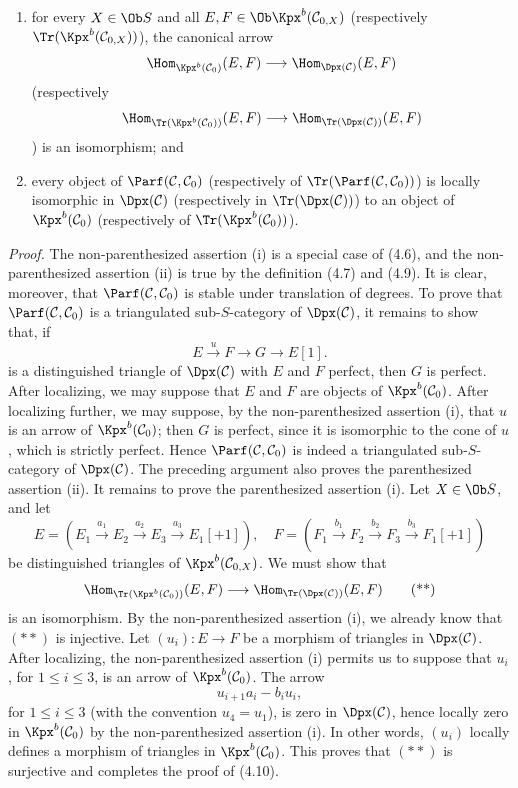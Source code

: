 \begin{enumerate}[label=(\roman*)]
\item for every \(X\in\Ob S\) and all \(E,F\in\Ob\Kpx^b(\mathcal C_{0,X})\) (respectively \(\Tr(\Kpx^b(\mathcal C_{0,X}))\)), the canonical arrow
\[
  \Hom_{\Kpx^b(\mathcal C_0)}(E,F)
  \longrightarrow
  \Hom_{\Dpx(\mathcal C)}(E,F)
\]
(respectively
\[
  \Hom_{\Tr(\Kpx^b(\mathcal C_0))}(E,F)
  \longrightarrow
  \Hom_{\Tr(\Dpx(\mathcal C))}(E,F)
\]) is an isomorphism; and
\item every object of \(\Parf(\mathcal C,\mathcal C_0)\) (respectively of \(\Tr(\Parf(\mathcal C,\mathcal C_0))\)) is locally isomorphic in \(\Dpx(\mathcal C)\) (respectively in \(\Tr(\Dpx(\mathcal C))\)) to an object of \(\Kpx^b(\mathcal C_0)\) (respectively of \(\Tr(\Kpx^b(\mathcal C_0))\)).
\end{enumerate}

\emph{Proof.} The non-parenthesized assertion (i) is a special case of (4.6), and the non-parenthesized assertion (ii) is true by the definition (4.7) and (4.9). It is clear, moreover, that \(\Parf(\mathcal C,\mathcal C_0)\) is stable under translation of degrees. To prove that \(\Parf(\mathcal C,\mathcal C_0)\) is a triangulated sub-\(S\)-category of \(\Dpx(\mathcal C)\), it remains to show that, if
\[
  E\xrightarrow{u}F\longrightarrow G\longrightarrow E[1].
  \tag{*}
\]
is a distinguished triangle of \(\Dpx(\mathcal C)\) with \(E\) and \(F\) perfect, then \(G\) is perfect. After localizing, we may suppose that \(E\) and \(F\) are objects of \(\Kpx^b(\mathcal C_0)\). After localizing further, we may suppose, by the non-parenthesized assertion (i), that \(u\) is an arrow of \(\Kpx^b(\mathcal C_0)\); then \(G\) is perfect, since it is isomorphic to the cone of \(u\), which is strictly perfect. Hence \(\Parf(\mathcal C,\mathcal C_0)\) is indeed a triangulated sub-\(S\)-category of \(\Dpx(\mathcal C)\). The preceding argument also proves the parenthesized assertion (ii). It remains to prove the parenthesized assertion (i). Let \(X\in\Ob S\), and let
\[
E=(E_1\xrightarrow{a_1}E_2\xrightarrow{a_2}E_3\xrightarrow{a_3}E_1[+1]),
\quad
F=(F_1\xrightarrow{b_1}F_2\xrightarrow{b_2}F_3\xrightarrow{b_3}F_1[+1])
\]
be distinguished triangles of \(\Kpx^b(\mathcal C_{0,X})\). We must show that
\[
  \Hom_{\Tr(\Kpx^b(\mathcal C_0))}(E,F)
  \longrightarrow
  \Hom_{\Tr(\Dpx(\mathcal C))}(E,F)
  \tag{**}
\]
is an isomorphism. By the non-parenthesized assertion (i), we already know that \((**)\) is injective. Let \((u_i):E\to F\) be a morphism of triangles in \(\Dpx(\mathcal C)\). After localizing, the non-parenthesized assertion (i) permits us to suppose that \(u_i\), for \(1\leq i\leq3\), is an arrow of \(\Kpx^b(\mathcal C_0)\). The arrow
\[
  u_{i+1}a_i-b_iu_i,
\]
for \(1\leq i\leq3\) (with the convention \(u_4=u_1\)), is zero in \(\Dpx(\mathcal C)\), hence locally zero in \(\Kpx^b(\mathcal C_0)\) by the non-parenthesized assertion (i). In other words, \((u_i)\) locally defines a morphism of triangles in \(\Kpx^b(\mathcal C_0)\). This proves that \((**)\) is surjective and completes the proof of (4.10).

